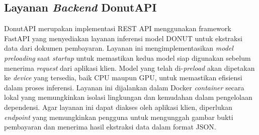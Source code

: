 \subsection{Layanan \emph{Backend} DonutAPI}
\label{subsec:backend-service-donutapi}

DonutAPI merupakan implementasi REST API menggunakan framework FastAPI yang menyediakan layanan inferensi model DONUT untuk ekstraksi data dari dokumen pembayaran. Layanan ini  mengimplementasikan \emph{model preloading} saat \emph{startup} untuk memastikan kedua model siap digunakan sebelum menerima \emph{request} dari aplikasi klien. Model yang telah di-\emph{preload} akan dipetakan ke \emph{device} yang tersedia, baik CPU maupun GPU, untuk memastikan efisiensi dalam proses inferensi. Layanan ini dijalankan dalam Docker \emph{container} secara lokal yang memungkinkan isolasi lingkungan dan kemudahan dalam pengelolaan dependensi. Agar layanan ini dapat diakses oleh aplikasi klien, diperlukan \emph{endpoint} yang memungkinkan pengguna untuk mengunggah gambar bukti pembayaran dan menerima hasil ekstraksi data dalam format JSON. 





